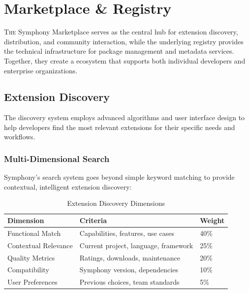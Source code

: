 
\section{Marketplace \& Registry}
\label{sec:marketplace-registry}

\lettrine{T}{he} Symphony Marketplace serves as the central hub for extension discovery, distribution, and community interaction, while the underlying registry provides the technical infrastructure for package management and metadata services. Together, they create a ecosystem that supports both individual developers and enterprise organizations.

\subsection{Extension Discovery}
\label{subsec:extension-discovery}

The discovery system employs advanced algorithms and user interface design to help developers find the most relevant extensions for their specific needs and workflows.

\subsubsection{Multi-Dimensional Search}
\label{subsubsec:multi-dimensional-search}

Symphony's search system goes beyond simple keyword matching to provide contextual, intelligent extension discovery:

\begin{table}[h]
\centering
\caption{Extension Discovery Dimensions}
\label{tab:discovery-dimensions}
\begin{tabular}{@{}lll@{}}
\toprule
\textbf{Dimension} & \textbf{Criteria} & \textbf{Weight} \\
\midrule
Functional Match & Capabilities, features, use cases & 40\% \\
Contextual Relevance & Current project, language, framework & 25\% \\
Quality Metrics & Ratings, downloads, maintenance & 20\% \\
Compatibility & Symphony version, dependencies & 10\% \\
User Preferences & Previous choices, team standards & 5\% \\
\bottomrule
\end{tabular}
\end{table}

